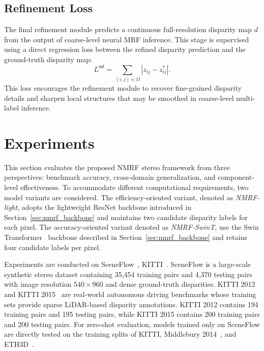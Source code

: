 \subsection{Refinement Loss}

The final refinement module predicts a continuous full-resolution disparity map $d$ from the output of coarse-level neural MRF inference. 
This stage is supervised using a direct regression loss between the refined disparity prediction and the ground-truth disparity map:
\begin{equation}
	L^{\textsf{ref}}
	=
	\sum_{(i,j)\in\Omega}
	\left|
	z_{ij}-z_{ij}^* 
	\right|.
	\label{eq:l-ref}
\end{equation}
This loss encourages the refinement module to recover fine-grained disparity details and sharpen local structures that may be smoothed in coarse-level multi-label inference.

\section{Experiments}
This section evaluates the proposed NMRF stereo framework from three perspectives: benchmark accuracy, cross-domain generalization, and component-level effectiveness.
To accommodate different computational requirements, two model variants are considered.
The efficiency-oriented variant, denoted as \emph{NMRF-light}, adopts the lightweight ResNet backbone introduced in Section~\ref{sec:nmrf_backbone} and maintains two candidate disparity labels for each pixel.
The accuracy-oriented variant denoted as \emph{NMRF-SwinT}, use the Swin Transformer~\cite{liu2021Swin} backbone described in Section~\ref{sec:nmrf_backbone} and retains four candidate labels per pixel.

Experiments are conducted on SceneFlow~\cite{mayer2016large}, KITTI~\cite{geiger2012we,menze2015object}.
SceneFlow is a large-scale synthetic stereo dataset containing 35,454 training pairs and 4,370 testing pairs with image resolution $540\times 960$ and dense ground-truth disparities.
KITTI 2012~\cite{geiger2012we} and KITTI 2015~\cite{menze2015object} are real-world autonomous driving benchmarks whose training sets provide sparse LiDAR-based disparity annotations.
KITTI 2012 contains 194 training pairs and 195 testing pairs, while KITTI 2015 contains 200 training pairs and 200 testing pairs.
For zero-shot evaluation, models trained only on SceneFlow are directly tested on the training splits of KITTI, Middlebury 2014~\cite{scharstein2014high}, and ETH3D~\cite{schops2017multi}.

